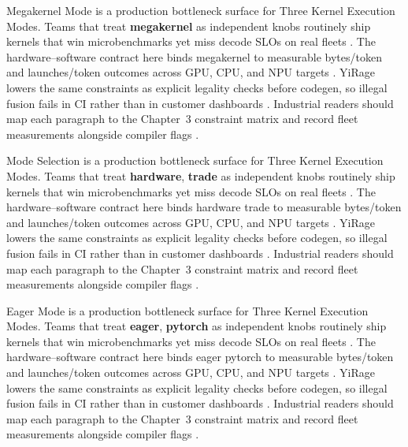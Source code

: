 Megakernel Mode is a production bottleneck surface for Three Kernel Execution Modes. Teams that treat \textbf{megakernel} as independent knobs routinely ship kernels that win microbenchmarks yet miss decode SLOs on real fleets \citep{nvidia2024cudagraphs,taxbreak2026}. The hardware--software contract here binds megakernel to measurable bytes/token and launches/token outcomes across GPU, CPU, and NPU targets \citep{liu2024deepseekv3,memoryfloor2026}. YiRage lowers the same constraints as explicit legality checks before codegen, so illegal fusion fails in CI rather than in customer dashboards \citep{patel2025llminference,nvidia2022hopper}. Industrial readers should map each paragraph to the Chapter~3 constraint matrix and record fleet measurements alongside compiler flags \citep{taxbreak2026,semianalysis2024tma}.

Mode Selection is a production bottleneck surface for Three Kernel Execution Modes. Teams that treat \textbf{hardware}, \textbf{trade} as independent knobs routinely ship kernels that win microbenchmarks yet miss decode SLOs on real fleets \citep{liu2024deepseekv3,memoryfloor2026}. The hardware--software contract here binds hardware trade to measurable bytes/token and launches/token outcomes across GPU, CPU, and NPU targets \citep{patel2025llminference,nvidia2022hopper}. YiRage lowers the same constraints as explicit legality checks before codegen, so illegal fusion fails in CI rather than in customer dashboards \citep{taxbreak2026,semianalysis2024tma}. Industrial readers should map each paragraph to the Chapter~3 constraint matrix and record fleet measurements alongside compiler flags \citep{memoryfloor2026,amd2024xdna}.

Eager Mode is a production bottleneck surface for Three Kernel Execution Modes. Teams that treat \textbf{eager}, \textbf{pytorch} as independent knobs routinely ship kernels that win microbenchmarks yet miss decode SLOs on real fleets \citep{patel2025llminference,nvidia2022hopper}. The hardware--software contract here binds eager pytorch to measurable bytes/token and launches/token outcomes across GPU, CPU, and NPU targets \citep{taxbreak2026,semianalysis2024tma}. YiRage lowers the same constraints as explicit legality checks before codegen, so illegal fusion fails in CI rather than in customer dashboards \citep{memoryfloor2026,amd2024xdna}. Industrial readers should map each paragraph to the Chapter~3 constraint matrix and record fleet measurements alongside compiler flags \citep{nvidia2022hopper,amd2024aie}.

